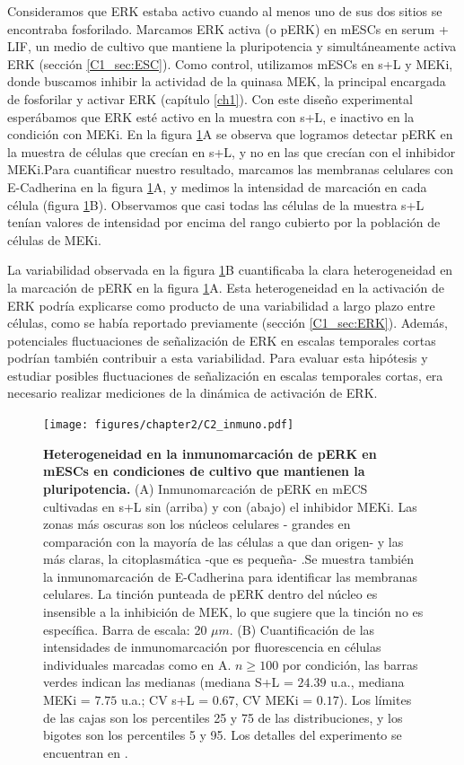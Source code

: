 \documentclass[./main.tex]{subfiles}
\begin{document}
Consideramos que ERK estaba activo cuando al menos uno de sus dos sitios se encontraba fosforilado. Marcamos ERK activa (o pERK) en mESCs en serum + LIF, un medio de cultivo que mantiene la pluripotencia y simultáneamente activa ERK (sección \ref{C1_sec:ESC}). Como control, utilizamos mESCs en s+L y MEKi, donde buscamos inhibir la actividad de la quinasa MEK, la principal encargada de fosforilar y activar ERK (capítulo \ref{ch1}). Con este diseño experimental esperábamos que ERK esté activo en la muestra con s+L, e inactivo en la condición con MEKi. En la figura \ref{C2_fig:inmuno}A se observa que logramos detectar pERK en la muestra de células que crecían en s+L, y no en las que crecían con el inhibidor MEKi.Para cuantificar nuestro resultado, marcamos las membranas celulares con E-Cadherina en la figura \ref{C2_fig:inmuno}A, y medimos la intensidad de marcación en cada célula (figura \ref{C2_fig:inmuno}B). Observamos que casi todas las células de la muestra s+L tenían valores de intensidad por encima del rango cubierto por la población de células de MEKi. 

La variabilidad observada en la figura \ref{C2_fig:inmuno}B cuantificaba la clara heterogeneidad en la marcación de pERK en la figura \ref{C2_fig:inmuno}A. Esta heterogeneidad en la activación de ERK podría explicarse como producto de una variabilidad a largo plazo entre células, como se había reportado previamente \cite{Deathridge2019} (sección \ref{C1_sec:ERK}). Además, potenciales fluctuaciones de señalización de ERK en escalas temporales cortas podrían también contribuir a esta variabilidad. Para evaluar esta hipótesis y estudiar posibles fluctuaciones de señalización en escalas temporales cortas, era necesario realizar mediciones de la dinámica de activación de ERK. 

\begin{figure}
    \centering
    \texttt{[image: figures/chapter2/C2\_inmuno.pdf]} 
    \caption{\textbf{Heterogeneidad en la inmunomarcación de pERK en mESCs en condiciones de cultivo que mantienen la pluripotencia.} (A) Inmunomarcación de pERK en mECS cultivadas en s+L sin (arriba) y con (abajo) el inhibidor MEKi. Las zonas más oscuras son los núcleos celulares - grandes en comparación con la mayoría de las células a que dan origen- y las más claras, la citoplasmática -que es pequeña- .Se muestra también la inmunomarcación de E-Cadherina para identificar las membranas celulares. La tinción punteada de pERK dentro del núcleo es insensible a la inhibición de MEK, lo que sugiere que la tinción no es específica. Barra de escala: 20 $\mu m$. (B) Cuantificación de las intensidades de inmunomarcación por fluorescencia en células individuales marcadas como en A. $n \geq 100$ por condición, las barras verdes indican las medianas (mediana S+L = $24.39$ u.a., mediana MEKi = $7.75$ u.a.; CV s+L = $0.67$, CV MEKi = $0.17$). Los límites de las cajas son los percentiles 25 y 75 de las distribuciones, y los bigotes son los percentiles 5 y 95. Los detalles del experimento se encuentran en \cite{Fabris2022}.}
    \label{C2_fig:inmuno}
\end{figure}
\end{document}
